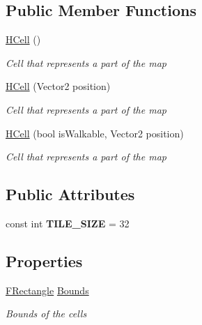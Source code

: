 \subsection*{Public Member Functions}
\begin{DoxyCompactItemize}
\item 
\hyperlink{class_hel_project_1_1_game_world_1_1_map_1_1_h_cell_a668a877ddffe6ff8e1dca674214a9c3d}{H\+Cell} ()
\begin{DoxyCompactList}\small\item\em Cell that represents a part of the map \end{DoxyCompactList}\item 
\hyperlink{class_hel_project_1_1_game_world_1_1_map_1_1_h_cell_a32bbca9e2eadd8aeeb956629418f00f1}{H\+Cell} (Vector2 position)
\begin{DoxyCompactList}\small\item\em Cell that represents a part of the map \end{DoxyCompactList}\item 
\hyperlink{class_hel_project_1_1_game_world_1_1_map_1_1_h_cell_ac17c0998ae60d46ea3b6e1d7ca29e54e}{H\+Cell} (bool is\+Walkable, Vector2 position)
\begin{DoxyCompactList}\small\item\em Cell that represents a part of the map \end{DoxyCompactList}\end{DoxyCompactItemize}
\subsection*{Public Attributes}
\begin{DoxyCompactItemize}
\item 
\hypertarget{class_hel_project_1_1_game_world_1_1_map_1_1_h_cell_ae39c780d2536601254122162487f8a79}{}const int {\bfseries T\+I\+L\+E\+\_\+\+S\+I\+Z\+E} = 32\label{class_hel_project_1_1_game_world_1_1_map_1_1_h_cell_ae39c780d2536601254122162487f8a79}

\end{DoxyCompactItemize}
\subsection*{Properties}
\begin{DoxyCompactItemize}
\item 
\hyperlink{class_hel_project_1_1_tools_1_1_f_rectangle}{F\+Rectangle} \hyperlink{class_hel_project_1_1_game_world_1_1_map_1_1_h_cell_a04c8b19e74486d6a2c05b700895290aa}{Bounds}
\begin{DoxyCompactList}\small\item\em Bounds of the cells \end{DoxyCompactList}\end{DoxyCompactItemize}
